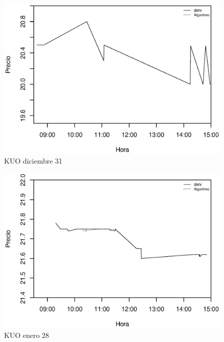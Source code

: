 \documentclass[10pt]{article}
\begin{document}
\begin{figure}[htbp] \centering
\includegraphics[scale=0.75, trim=0 0 0 2cm]{kuo123110.eps}
\caption{KUO diciembre 31}
\label{kuo1231}
\end{figure}

\begin{figure}[htbp] \centering
\includegraphics[scale=0.75, trim=0 0 0 2cm]{kuo012811.eps}
\caption{KUO enero 28}
\label{kuo0128}
\end{figure}
\end{document}
